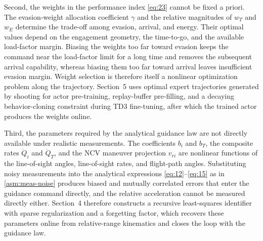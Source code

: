 Second, the weights in the performance index \eqref{eq:23} cannot be fixed a priori. The evasion-weight allocation coefficient $\gamma$ and the relative magnitudes of ${w_T}$ and ${w_E}$ determine the trade-off among evasion, arrival, and energy. Their optimal values depend on the engagement geometry, the time-to-go, and the available load-factor margin. Biasing the weights too far toward evasion keeps the command near the load-factor limit for a long time and removes the subsequent arrival capability, whereas biasing them too far toward arrival leaves insufficient evasion margin. Weight selection is therefore itself a nonlinear optimization problem along the trajectory. Section~5 uses optimal expert trajectories generated by shooting for actor pre-training, replay-buffer pre-filling, and a decaying behavior-cloning constraint during TD3 fine-tuning, after which the trained actor produces the weights online.

Third, the parameters required by the analytical guidance law are not directly available under realistic measurements. The coefficients ${b_i}$ and ${b_T}$, the composite rates ${\dot Q_i}$ and ${\dot Q_T}$, and the NCV maneuver projection ${v_{ri}}$ are nonlinear functions of the line-of-sight angles, line-of-sight rates, and flight-path angles. Substituting noisy measurements into the analytical expressions \eqref{eq:12}--\eqref{eq:15} as in \cref{asm:meas-noise} produces biased and mutually correlated errors that enter the guidance command directly, and the relative acceleration cannot be measured directly either. Section~4 therefore constructs a recursive least-squares identifier with sparse regularization and a forgetting factor, which recovers these parameters online from relative-range kinematics and closes the loop with the guidance law.
